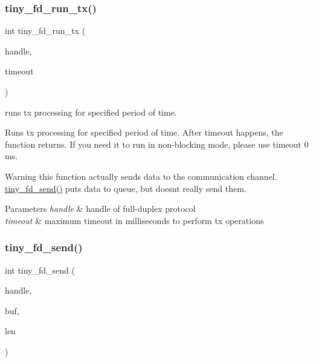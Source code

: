 \subsubsection{\texorpdfstring{tiny\+\_\+fd\+\_\+run\+\_\+tx()}{tiny\_fd\_run\_tx()}}
{\footnotesize\ttfamily int tiny\+\_\+fd\+\_\+run\+\_\+tx (\begin{DoxyParamCaption}\item[{\hyperlink{tiny__fd_8h_a91e6b79431fe38570fb102701ef0b7e8}{tiny\+\_\+fd\+\_\+handle\+\_\+t}}]{handle,  }\item[{uint16\+\_\+t}]{timeout }\end{DoxyParamCaption})}



runs tx processing for specified period of time. 

Runs tx processing for specified period of time. After timeout happens, the function returns. If you need it to run in non-\/blocking mode, please use timeout 0 ms.

\begin{DoxyWarning}{Warning}
this function actually sends data to the communication channel. \hyperlink{group__FULL__DUPLEX__API_ga490157ee98ea6148f99a5bb1f26c5f60}{tiny\+\_\+fd\+\_\+send()} puts data to queue, but doesn\textquotesingle{}t really send them.
\end{DoxyWarning}

\begin{DoxyParams}{Parameters}
{\em handle} & handle of full-\/duplex protocol \\
\hline
{\em timeout} & maximum timeout in milliseconds to perform tx operations \\
\hline
\end{DoxyParams}
\mbox{\label{group__FULL__DUPLEX__API_ga490157ee98ea6148f99a5bb1f26c5f60}} 
\subsubsection{\texorpdfstring{tiny\+\_\+fd\+\_\+send()}{tiny\_fd\_send()}}
{\footnotesize\ttfamily int tiny\+\_\+fd\+\_\+send (\begin{DoxyParamCaption}\item[{\hyperlink{tiny__fd_8h_a91e6b79431fe38570fb102701ef0b7e8}{tiny\+\_\+fd\+\_\+handle\+\_\+t}}]{handle,  }\item[{const void $\ast$}]{buf,  }\item[{int}]{len }\end{DoxyParamCaption})}



